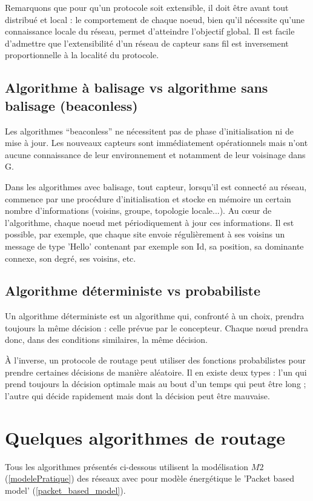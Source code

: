 Remarquons que pour qu'un protocole soit extensible, il doit être avant tout distribué et local :  le comportement de chaque noeud, bien qu'il nécessite qu'une connaissance locale du réseau, permet d'atteindre l'objectif global. Il est facile d'admettre que l'extensibilité d'un réseau de capteur sans fil est inversement proportionnelle à la localité du protocole.



\subsection{Algorithme à balisage vs algorithme sans balisage (beaconless)}
Les algorithmes ``beaconless'' ne nécessitent pas de phase d'initialisation ni de mise à jour. Les nouveaux capteurs sont immédiatement opérationnels mais n'ont aucune connaissance de leur environnement et notamment de leur voisinage dans G. 

Dans les algorithmes avec balisage, tout capteur, lorsqu'il est connecté au réseau, commence par une procédure d'initialisation et stocke en mémoire un certain nombre d'informations (voisins, groupe, topologie locale...). Au cœur de l'algorithme, chaque noeud met périodiquement à jour ces informations. Il est possible, par exemple, que chaque site envoie régulièrement à ses voisins un message de type
'Hello' contenant par exemple son Id, sa position, sa dominante connexe, son degré, ses voisins, etc.



\subsection{Algorithme déterministe vs probabiliste}
Un algorithme déterministe est un algorithme qui, confronté à un choix, prendra toujours la même décision : celle prévue par le concepteur. Chaque nœud prendra donc, dans des conditions similaires, la même décision.

À l'inverse, un protocole de routage peut utiliser des fonctions probabilistes pour prendre certaines décisions de manière aléatoire. Il en existe deux types : l'un qui prend toujours la décision optimale mais au bout d'un temps qui peut être long ; l'autre qui décide rapidement mais dont la décision peut être mauvaise.



\section{Quelques algorithmes de routage}
Tous les algorithmes présentés ci-dessous utilisent la modélisation $M2$ (\ref{modelePratique}) des réseaux avec pour modèle énergétique le 'Packet based model' (\ref{packet_based_model}).


